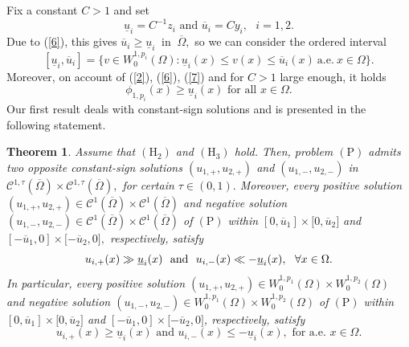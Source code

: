 \documentclass[11pt]{amsart}
\newtheorem{theorem}{Theorem}[section]
\theoremstyle{definition}
\theoremstyle{remark}
\numberwithin{equation}{section}
\begin{document}
Fix a constant $C>1$ and set%
\begin{equation}
\underline{u}_{i}=C^{-1}z_{i}\text{ \ and \ }\overline{u}_{i}=Cy_{i},\text{ }%
i=1,2.  \label{7}
\end{equation}%
Due to (\ref{6}), this gives $\overline{u}_{i}\geq \underline{u}_{i}\ $ in $%
\ \overline{\Omega },$ so we can consider the ordered interval 
\begin{equation*}
\left[ \underline{u}_{i},\overline{u}_{i}\right] =\{v\in
W_{0}^{1,p_{i}}(\Omega ):\underline{u}_{i}(x)\leq v(x)\leq \overline{u}%
_{i}(x)\ \text{a.e.}\ x\in \Omega \}.
\end{equation*}%
Moreover, on account of (\ref{2}), (\ref{6}), (\ref{7}) and for $C>1$ large
enough, it holds%
\begin{equation}
\phi _{1,p_{i}}(x)\geq \underline{u}_{i}(x)\text{ for all }x\in \Omega .
\label{8}
\end{equation}%
Our first result deals with constant-sign solutions and is presented in the
following statement.

\begin{theorem}
\label{T1}Assume that $(\mathrm{H}_{2})$ and $(\mathrm{H}_{3})$ hold. Then,
problem $(\mathrm{P})$ admits two opposite constant-sign solutions $%
(u_{1,+},u_{2,+})$ and $(u_{1,-},u_{2,-})$ in $\mathcal{C}^{1,\tau }( 
\overline{\Omega })\times \mathcal{C}^{1,\tau }(\overline{\Omega }),$ for
certain $\tau \in (0,1).$ Moreover, every positive solution $%
(u_{1,+},u_{2,+})\in \mathcal{C}^{1}(\overline{\Omega })\times \mathcal{C}
^{1}(\overline{\Omega })$ and negative solution $(u_{1,-},u_{2,-})\in 
\mathcal{C}^{1}(\overline{\Omega })\times \mathcal{C}^{1}(\overline{\Omega }
) $ of $(\mathrm{P})$ within $[0,\overline{u}_{1}]\times \lbrack 0,\overline{
u}_{2}]$ and $[-\overline{u}_{1},0]\times \lbrack -\overline{u}_{2},0],$
respectively, satisfy 
\begin{equation}
u_{i,+}(x)\gg \underline{u}_{i}(x)\text{ \ and \ }u_{i,-}(x)\ll -\underline{%
u }_{i}(x),\text{ \ }\forall x\in \Omega .  \label{9}
\end{equation}
In particular, every positive solution $(u_{1,+},u_{2,+})\in
W_{0}^{1,p_{1}}(\Omega )\times W_{0}^{1,p_{2}}(\Omega )$ and negative
solution $(u_{1,-},u_{2,-})\in W_{0}^{1,p_{1}}(\Omega )\times
W_{0}^{1,p_{2}}(\Omega )$ of $(\mathrm{P})$ within $[0,\overline{u}
_{1}]\times \lbrack 0,\overline{u}_{2}]$ and $[-\overline{u}_{1},0]\times
\lbrack -\overline{u}_{2},0]$, respectively, satisfy 
\begin{equation}
u_{i,+}(x)\geq \underline{u}_{i}(x)\text{ \ and \ }u_{i,-}(x)\leq - 
\underline{u}_{i}(x),\text{ \ for a.e. }x\in \Omega .  \label{10}
\end{equation}
\end{theorem}
\end{document}
